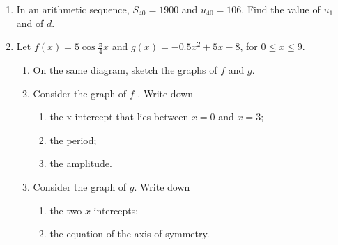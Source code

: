 \documentclass[12pt, twoside]{article}
\begin{document}
\begin{enumerate}
\item In an arithmetic sequence, $S_{40} =1900$ and $u_{40} =106$. Find the value of $u_1$ and of $d$.

\newpage

\item Let $\displaystyle f(x) = 5 \cos \frac{\pi}{4} x$ and $g(x)= -0.5 x^2 +5x-8$, for $0 \leq x \leq 9$.
  \begin{enumerate}
    \item On the same diagram, sketch the graphs of $f$ and $g$.
    \item Consider the graph of $f$ . Write down
      \begin{enumerate}
      \item the x-intercept that lies between $x = 0$ and $x = 3$;
      \item the period;
      \item the amplitude.
      \end{enumerate}
    \item Consider the graph of $g$. Write down
      \begin{enumerate}
      \item the two $x$-intercepts;
      \item the equation of the axis of symmetry.
      \end{enumerate}
  \end{enumerate}

\end{enumerate}
\end{document}
